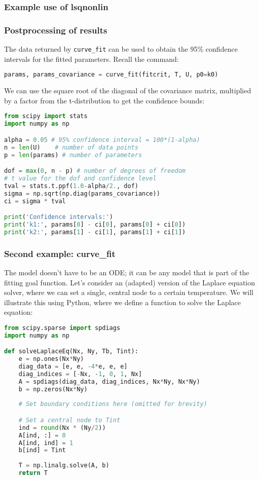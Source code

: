 \begin{frame}[fragile] 
  \frametitle{Example use of lsqnonlin}
  \centering
\end{frame}

\begin{frame}[fragile] 
  \frametitle{Postprocessing of results}
  The data returned by \lstinline|curve_fit| can be used to obtain the 95\% confidence intervals for the fitted parameters. Recall the command:
  \begin{lstlisting}[language=Python]
params, params_covariance = curve_fit(fitcrit, T, U, p0=k0)
  \end{lstlisting}
  We can use the square root of the diagonal of the covariance matrix, multiplied by a factor from the t-distribution to get the confidence bounds:
  \begin{lstlisting}[language=Python,basicstyle=\scriptsize]
from scipy import stats
import numpy as np

alpha = 0.05 # 95% confidence interval = 100*(1-alpha)
n = len(U)    # number of data points
p = len(params) # number of parameters

dof = max(0, n - p) # number of degrees of freedom
# t value for the dof and confidence level
tval = stats.t.ppf(1.0-alpha/2., dof) 
sigma = np.sqrt(np.diag(params_covariance))
ci = sigma * tval

print('Confidence intervals:')
print('k1:', params[0] - ci[0], params[0] + ci[0])
print('k2:', params[1] - ci[1], params[1] + ci[1])
  \end{lstlisting}
  \end{frame}


  \begin{frame}[fragile]
    \frametitle{Second example: curve\_fit}
    The model doesn't have to be an ODE; it can be any model that is part of the fitting goal function. Let's consider an (adapted) version of the Laplace equation solver, where we can set a single, central node to a certain temperature. We will illustrate this using Python, where we define a function to solve the Laplace equation:
    
    \begin{lstlisting}[language=Python, basicstyle=\scriptsize]
from scipy.sparse import spdiags
import numpy as np

def solveLaplaceEq(Nx, Ny, Tb, Tint):
    e = np.ones(Nx*Ny)
    diag_data = [e, e, -4*e, e, e]
    diag_indices = [-Nx, -1, 0, 1, Nx]
    A = spdiags(diag_data, diag_indices, Nx*Ny, Nx*Ny)
    b = np.zeros(Nx*Ny)
    
    # Set boundary conditions here (omitted for brevity)

    # Set a central node to Tint
    ind = round(Nx * (Ny/2))
    A[ind, :] = 0
    A[ind, ind] = 1
    b[ind] = Tint
    
    T = np.linalg.solve(A, b)
    return T
    \end{lstlisting}
  \end{frame}
  

